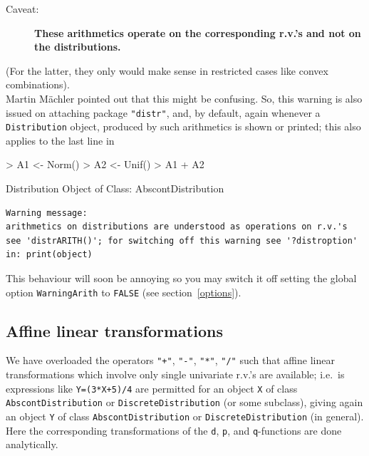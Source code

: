 \documentclass[11pt]{article}
\newcommand{\code}[1]{{\tt #1}}
\newcommand{\pkg}[1]{{\tt "#1"}}
\begin{document}
\begin{description}
  \item[{\Large \sc Caveat:\/}] {\bf These arithmetics
operate on the corresponding r.v.'s and {\bf not} on the distributions.}
\end{description}
(For the latter, they only would make sense in restricted cases like convex combinations).\\

Martin M\"achler pointed out that this might be confusing. So, this warning is also issued
on attaching package \pkg{distr}, and,  by default, again whenever a \code{Distribution}
object, produced by such arithmetics is shown or printed; this also applies to the last line in
\begin{Schunk}
\begin{Sinput}
> A1 <- Norm()
> A2 <- Unif()
> A1 + A2
\end{Sinput}
\begin{Soutput}
Distribution Object of Class: AbscontDistribution
\end{Soutput}
\end{Schunk}
\begin{verbatim}
Warning message:
arithmetics on distributions are understood as operations on r.v.'s
see 'distrARITH()'; for switching off this warning see '?distroption' in: print(object)
\end{verbatim}
This behaviour will soon be annoying so you may switch it off setting the global option
\code{WarningArith} to \code{FALSE} (see section~\ref{options}).
%
\subsection{Affine linear transformations}
%
We have overloaded the operators \code{"+"}, \code{"-"}, \code{"*"}, \code{"/"} such that
affine linear transformations which involve only single univariate r.v.'s are available;
i.e.\ is expressions like \code{Y=(3*X+5)/4} are permitted for an object \code{X} of class \code{AbscontDistribution}
or \code{DiscreteDistribution}
(or some subclass), giving again an object \code{Y} of
class \code{AbscontDistribution} or \code{DiscreteDistribution} (in general).
Here the corresponding transformations of the \code{d}, \code{p}, and \code{q}-functions are done
analytically.
%
\end{document}
